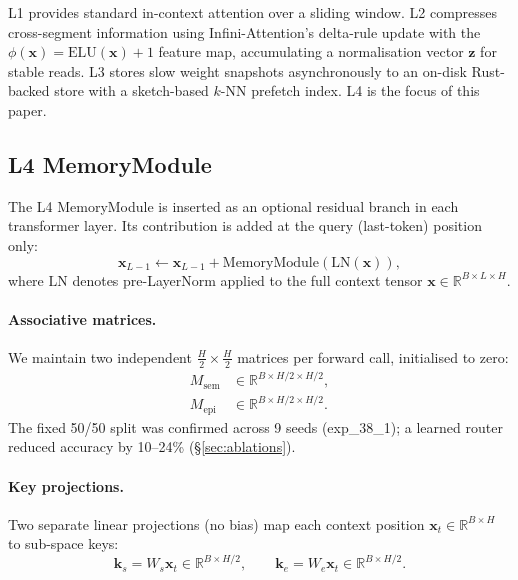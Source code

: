 \documentclass{article}
\newcommand{\Msem}{M_{\mathrm{sem}}}
\newcommand{\Mepi}{M_{\mathrm{epi}}}
\newcommand{\ks}{\mathbf{k}_s}
\newcommand{\ke}{\mathbf{k}_e}
\newcommand{\bx}{\mathbf{x}}
\begin{document}
L1 provides standard in-context attention over a sliding window.  L2 compresses
cross-segment information using Infini-Attention's delta-rule update with the
$\phi(\bx) = \mathrm{ELU}(\bx)+1$ feature map, accumulating a normalisation vector
$\mathbf{z}$ for stable reads.  L3 stores slow weight snapshots asynchronously to an
on-disk Rust-backed store with a sketch-based $k$-NN prefetch index.  L4 is the focus
of this paper.

\subsection{L4 MemoryModule}
\label{sec:l4}

The L4 MemoryModule is inserted as an optional residual branch in each transformer
layer.  Its contribution is added at the query (last-token) position only:
\begin{equation}
  \bx_{L-1} \leftarrow \bx_{L-1} + \mathrm{MemoryModule}\!\left(\mathrm{LN}(\bx)\right),
\end{equation}
where $\mathrm{LN}$ denotes pre-LayerNorm \citep{xiong2020layer} applied to the full
context tensor $\bx \in \mathbb{R}^{B \times L \times H}$.

\paragraph{Associative matrices.}
We maintain two independent $\tfrac{H}{2} \times \tfrac{H}{2}$ matrices per forward
call, initialised to zero:
\begin{align}
  \Msem &\in \mathbb{R}^{B \times H/2 \times H/2}, \\
  \Mepi &\in \mathbb{R}^{B \times H/2 \times H/2}.
\end{align}
The fixed 50/50 split was confirmed across 9 seeds (exp\_38\_1); a learned router
reduced accuracy by 10--24\% (\S\ref{sec:ablations}).

\paragraph{Key projections.}
Two separate linear projections (no bias) map each context position $\bx_t \in
\mathbb{R}^{B \times H}$ to sub-space keys:
\begin{equation}
  \ks = W_s \bx_t \in \mathbb{R}^{B \times H/2},
  \qquad
  \ke = W_e \bx_t \in \mathbb{R}^{B \times H/2}.
\end{equation}
\end{document}
